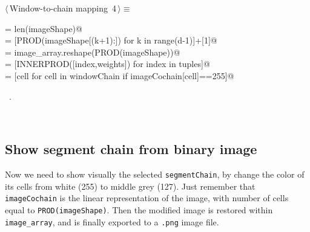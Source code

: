 \documentclass[11pt,oneside]{article}	%
\begin{document}
\begin{flushleft} \small
\begin{minipage}{\linewidth} \label{scrap6}
\protect{}$\langle\,$Window-to-chain mapping\nobreak\ {\footnotesize 4}$\,\rangle\equiv$
\vspace{-1ex}
\begin{list}{}{} \item
\mbox{}\verb@d = len(imageShape)@\\
\mbox{}\verb@weights = [PROD(imageShape[(k+1):]) for k in range(d-1)]+[1]@\\
\mbox{}\verb@imageCochain = image_array.reshape(PROD(imageShape))@\\
\mbox{}\verb@windowChain = [INNERPROD([index,weights]) for index in tuples]@\\
\mbox{}\verb@segmentChain = [cell for cell in windowChain if imageCochain[cell]==255]@\\
\mbox{}\verb@@{\NWsep}
\end{list}
\vspace{-1ex}
\footnotesize\addtolength{\baselineskip}{-1ex}
\begin{list}{}{\setlength{\itemsep}{-\parsep}\setlength{\itemindent}{-\leftmargin}}
\item \NWtxtMacroRefIn\ .
\end{list}
\end{minipage}\\[4ex]
\end{flushleft}

\subsection{Show segment chain from binary image}

Now we need to show visually the selected \texttt{segmentChain}, by change the color of its cells from white (255) to middle grey (127). Just remember that \texttt{imageCochain} is the linear representation of the image, with number of cells equal to \texttt{PROD(imageShape)}. Then the modified image is restored within \texttt{image\_array}, and is finally exported to a \texttt{.png} image file.
\end{document}
